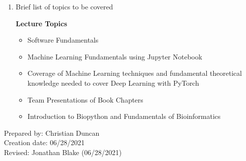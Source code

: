 \begin{enumerate}[1.]
\item Brief list of topics to be covered\\
  {\bfseries
    Lecture Topics
    \begin{itemize}
    \item Software Fundamentals
    \item Machine Learning Fundamentals using Jupyter Notebook
    \item Coverage of Machine Learning techniques and fundamental theoretical knowledge needed to cover Deep Learning with
PyTorch
    \item Team Presentations of Book Chapters
    \item Introduction to Biopython and Fundamentals of Bioinformatics
    \end{itemize}
  }

\end{enumerate}

\noindent Prepared by: Christian Duncan\\
\noindent Creation date: 06/28/2021\\
\noindent Revised: Jonathan Blake (06/28/2021)\\
